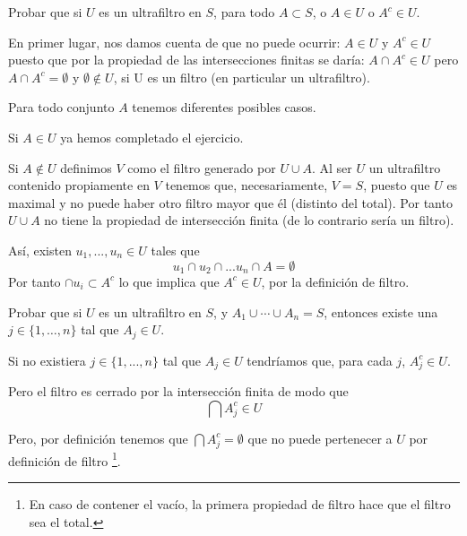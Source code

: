 \begin{problem}
Probar que si $U$ es un ultrafiltro en $S$, para todo $A\subset S$, o $A\in U$ o $A^c\in U$.

\solution

En primer lugar, nos damos cuenta de que no puede ocurrir: $A \in U$ y $A^c \in U$ puesto que por la propiedad de las intersecciones finitas se daría: $A \cap A^c \in U$ pero  $A \cap A^c  = \emptyset$ y $\emptyset \notin U$, si U es un filtro (en particular un ultrafiltro).

Para todo conjunto $A$ tenemos diferentes posibles casos.

Si $A \in U$ ya hemos completado el ejercicio.

Si $A \notin U$ definimos $V$ como el filtro generado por  $U \cup A$. Al ser $U$ un ultrafiltro contenido propiamente en $V$ tenemos que, necesariamente, $V=S$, puesto que $U$ es maximal y no puede haber otro filtro mayor que él (distinto del total). Por tanto $U \cup A$ no tiene la propiedad de intersección finita (de lo contrario sería un filtro).

Así, existen $u_1,...,u_n \in U$ tales que
\[u_1\cap u_2 \cap ... u_n \cap A = \emptyset\]
Por tanto $\cap u_i \subset A^c$ lo que implica que $A^c \in U$, por la definición de filtro.
\end{problem}

\begin{problem}
Probar que si $U$ es un ultrafiltro en $S$, y  $A_1 \cup \cdots \cup A_n = S$, entonces existe una $j\in \{ 1, \dots, n\}$ tal que
$A_j\in U$.

\solution

Si no existiera $j\in \{1,...,n\}$ tal que $A_j \in U$ tendríamos que, para cada $j$, $A_j^c \in U$.

Pero el filtro es cerrado por la intersección finita de modo que
\[\bigcap A_j^c \in U\]

Pero, por definición tenemos que $\bigcap A_j^c = \emptyset$ que no puede pertenecer a $U$ por definición de filtro \footnote{En caso de contener el vacío, la primera propiedad de filtro hace que el filtro sea el total.}.

\end{problem}

